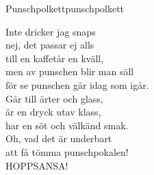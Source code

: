 \begin{song}{Punschpolkett}{punschpolkett}
\begin{vers}
Inte dricker jag snaps\\
nej, det passar ej alls\\
till en kaffetår en kväll, \\
men av punschen blir man säll\\
för se punschen går idag som igår.\\
Går till ärter och glass,\\
är en dryck utav klass,\\
har en söt och välkänd smak.\\
Oh, vad det är underbart\\
att få tömma punschpokalen!\\
HOPPSANSA!\\
\end{vers}
\end{song}
